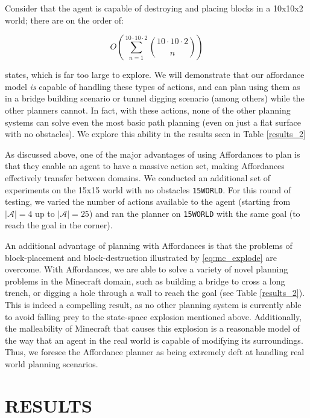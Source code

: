 \documentclass[]{article}
\begin{document}
Consider that the agent is capable of destroying and placing blocks 
in a 10x10x2 world; there are on the order of:

\begin{equation}
O\left(\sum_{n=1}^{10 \cdot 10 \cdot 2} \binom{10 \cdot 10 \cdot 2}{n}\right)
\label{eq:mc_explode}
\end{equation}

states, which is far too large to explore. We will demonstrate that our 
affordance model {\it is} capable of handling these types of actions, 
and can plan using them as in a bridge building scenario or tunnel 
digging scenario (among others) while the other planners cannot. 
In fact, with these actions, none of the other planning systems 
can solve even the most basic path planning (even on just a flat 
surface with no obstacles). We explore this ability in the results 
seen in Table \ref{results_2}

As discussed above, one of the major advantages of using Affordances 
to plan is that they enable an agent to have a massive action set, 
making Affordances effectively transfer between domains. We 
conducted an additional set of experiments on the 15x15 world 
with no obstacles \texttt{15WORLD}. For this round of testing, we 
varied the number of actions available to the agent (starting from 
$|\mathcal{A}| = 4$ up to $|\mathcal{A}| = 25$) and ran the planner 
on \texttt{15WORLD} with the same goal (to reach the goal in the corner).


An additional advantage of planning with Affordances is that the 
problems of block-placement and block-destruction illustrated by 
\ref{eq:mc_explode} are overcome. With Affordances, we are able 
to solve a variety of novel planning problems in the Minecraft 
domain, such as building a bridge to cross a long trench, or digging 
a hole through a wall to reach the goal (see Table \ref{results_2}). 
This is indeed a compelling result, as no other planning system is 
currently able to avoid falling prey to the state-space explosion 
mentioned above. Additionally, the malleability of Minecraft that 
causes this explosion is a reasonable model of the way that an 
agent in the real world is capable of modifying its surroundings. 
Thus, we foresee the Affordance planner as being extremely deft 
at handling real world planning scenarios.


\section{RESULTS}
\end{document}
